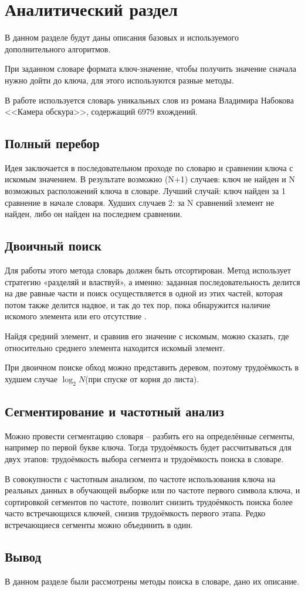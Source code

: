 \chapter{Аналитический раздел}
\label{cha:analysis}
В данном разделе будут даны описания базовых и используемого дополнительного алгоритмов. 
\par При заданном словаре формата ключ-значение, чтобы получить значение сначала нужно дойти до ключа, для этого используются разные методы.
\par В работе используется словарь уникальных слов из романа Владимира Набокова <<Камера обскура>>, содержащий 6979 вхождений.

\section{Полный перебор}
Идея заключается в последовательном проходе по словарю и сравнении ключа с искомым значением. В результате возможно (N+1) случаев: ключ не найден и N возможных расположений ключа в словаре. Лучший случай: ключ найден за 1 сравнение в начале словаря. Худших случаев 2: за N сравнений элемент не найден, либо он найден на последнем сравнении.
\section{Двоичный поиск}
Для работы этого метода словарь должен быть отсортирован. Метод использует стратегию «разделяй и властвуй», а именно: заданная последовательность делится на две равные части и поиск осуществляется в одной из этих частей, которая потом также делится надвое, и так до тех пор, пока обнаружится наличие искомого элемента или его отсутствие \cite{binsearch}.
\par Найдя средний элемент, и сравнив его значение с искомым, можно сказать, где относительно среднего элемента находится искомый элемент.
\par При двоичном поиске обход можно представить деревом, поэтому трудоёмкость в худшем случае $\log_{2}N$(при спуске от корня до листа).

\section{Сегментирование и частотный анализ}
Можно провести сегментацию словаря -- разбить его на определённые сегменты, например по первой букве ключа. Тогда трудоёмкость будет рассчитываться для двух этапов: трудоёмкость выбора сегмента и трудоёмкость поиска в словаре.
\par В совокупности с частотным анализом, по частоте использования ключа на реальных данных в обучающей выборке или по частоте первого символа ключа, и сортировкой сегментов по частоте, позволит снизить трудоёмкость поиска более часто встречающихся ключей, снизив трудоёмкость первого этапа. Редко встречающиеся сегменты можно объединить в один.

\section{Вывод}
В данном разделе были рассмотрены методы поиска в словаре, дано их описание.